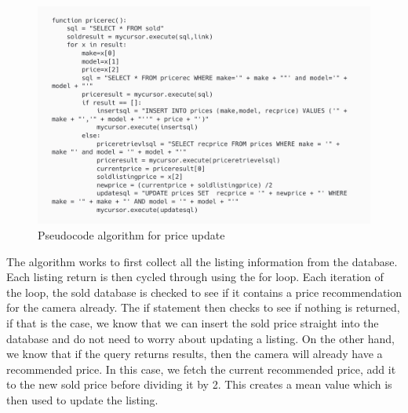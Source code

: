   \begin{figure}[H]
     \centering
     \includegraphics[scale=0.25]{ch3_developing/proto2/proto1_alg_price.png}
     \caption{Pseudocode algorithm for price update}
     \label{fig:proto1_algprice}
 \end{figure}
The algorithm works to first collect all the listing information from the database. Each listing return is then cycled through using the for loop. Each iteration of the loop, the sold database is checked to see if it contains a price recommendation for the camera already. The if statement then checks to see if nothing is returned, if that is the case, we know that we can insert the sold price straight into the database and do not need to worry about updating a listing. On the other hand, we know that if the query returns results, then the camera will already have a recommended price. In this case, we fetch the current recommended price, add it to the new sold price before dividing it by 2. This creates a mean value which is then used to update the listing. 

